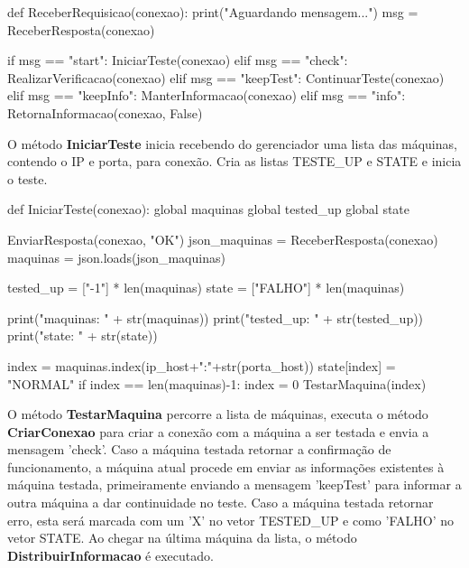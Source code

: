 \vspace*{1cm}
\begin{python}
def ReceberRequisicao(conexao):
    print("Aguardando mensagem...")
    msg = ReceberResposta(conexao)

    if msg == "start":
        IniciarTeste(conexao)
    elif msg == "check":
        RealizarVerificacao(conexao)
    elif msg == "keepTest":
        ContinuarTeste(conexao)
    elif msg == "keepInfo":
        ManterInformacao(conexao)
    elif msg == "info":
        RetornaInformacao(conexao, False)
\end{python}
\vspace*{1cm}

O método \textbf{IniciarTeste} inicia recebendo do gerenciador uma lista das máquinas, contendo o IP e porta, para conexão. Cria as listas TESTE\_UP e STATE e inicia o teste.

\vspace*{1cm}
\begin{python}
def IniciarTeste(conexao):
    global maquinas
    global tested_up
    global state

    EnviarResposta(conexao, "OK")
    json_maquinas = ReceberResposta(conexao)
    maquinas = json.loads(json_maquinas)

    tested_up = ["-1"] * len(maquinas)
    state = ["FALHO"] * len(maquinas)

    print("maquinas: " + str(maquinas))
    print("tested_up: " + str(tested_up))
    print("state: " + str(state))

    index = maquinas.index(ip_host+":"+str(porta_host))
    state[index] = "NORMAL"
    if index == len(maquinas)-1:
        index = 0
    TestarMaquina(index)
\end{python}
\vspace*{1cm}

O método \textbf{TestarMaquina} percorre a lista de máquinas, executa o método \textbf{CriarConexao} para criar a conexão com a máquina a ser testada e envia a mensagem 'check'. Caso 
a máquina testada retornar a confirmação de funcionamento, a máquina atual procede em enviar as informações existentes à máquina testada, primeiramente enviando a mensagem 'keepTest' para informar a outra máquina 
a dar continuidade no teste. Caso a máquina testada retornar erro, esta será marcada com um 'X' no vetor TESTED\_UP e como 'FALHO' no vetor STATE.
Ao chegar na última máquina da lista, o método \textbf{DistribuirInformacao} é executado.

